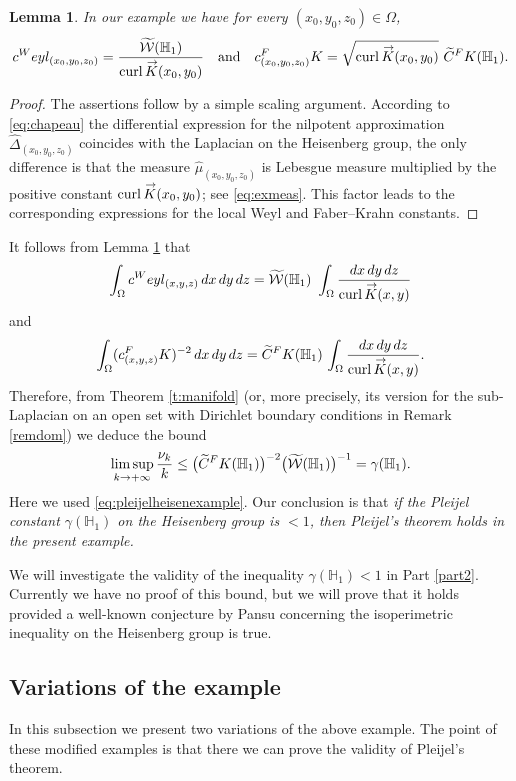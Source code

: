 \documentclass[11pt]{article}
\newcommand{\FK}{\textup{FK}}
\newcommand{\Weyl}{\textup{Weyl}}
\renewcommand{\vec}[1]
{\overset{\,{\raisebox{-2pt}{$\scriptstyle\to$}}}{#1}}
\newtheorem{lemma}[theorem]{Lemma}
\theoremstyle{definition}
\newcommand{\1}{\mathbbm{1}}
\numberwithin{equation}{section}
\begin{document}
\begin{lemma}\label{exampleconst}
In our example we have for every $(x_0,y_0,z_0)\in\Omega$,
\[
c^\Weyl_{(x_0,y_0,z_0)} = \frac{\widetilde{\mathcal W}(\mathbb H_1)}{\mathrm{curl}\,\vec{K}(x_0,y_0)}
\quad\text{and}\quad
c_{(x_0,y_0,z_0)}^\FK = \sqrt{\mathrm{curl}\,\vec{K}(x_0,y_0)} \ \widetilde C^\FK(\mathbb H_1).
\]
\end{lemma}

\begin{proof}
The assertions follow by a simple scaling argument. According to \eqref{eq:chapeau} the differential expression for the nilpotent approximation $\widehat\Delta_{(x_0,y_0,z_0)}$ coincides with the Laplacian on the Heisenberg group, the only difference is that the measure $\widehat\mu_{(x_0,y_0,z_0)}$ is Lebesgue measure multiplied by the positive constant $\mathrm{curl}\,\vec{K}(x_0,y_0)$; see \eqref{eq:exmeas}. This factor leads to the corresponding expressions for the local Weyl and Faber--Krahn constants.
\end{proof}

It follows from Lemma \ref{exampleconst} that
\[
\int_\Omega c^\Weyl_{(x,y,z)} \,dx\,dy\,dz = \widetilde{\mathcal W}(\mathbb H_1) \ \int_\Omega \frac{dx\,dy\,dz}{\text{curl}\,\vec{K}(x,y)}
\]
and
\[
\int_\Omega (c_{(x,y,z)}^\FK)^{-2} \,dx\,dy\,dz = \widetilde C^\FK(\mathbb H_1) \,\int_\Omega \frac{dx\,dy\,dz}{\text{curl}\,\vec{K}(x,y)}.
\]
Therefore, from Theorem \ref{t:manifold} (or, more precisely, its version for the sub-Laplacian on an open set with Dirichlet boundary conditions in Remark \ref{remdom}) we deduce the bound
\[
\limsup_{k\to+\infty} \frac{\nu_k}{k} \leq \bigl(\widetilde C^\FK(\mathbb H_1)\bigr)^{-2} \bigl(\widetilde{\mathcal W}(\mathbb H_1)\bigr)^{-1} = \gamma(\mathbb H_1).
\]
Here we used \eqref{eq:pleijelheisenexample}. Our conclusion is that \emph{if the Pleijel constant $\gamma(\mathbb H_1)$ on the Heisenberg group is $<1$, then Pleijel's theorem holds in the present example.}

We will investigate the validity of the inequality $\gamma(\mathbb H_1)<1$ in Part \ref{part2}. Currently we have no proof of this bound, but we will prove that it holds provided a well-known conjecture by Pansu concerning the isoperimetric inequality on the Heisenberg group is true.

\subsection{Variations of the example}
In this subsection we present two variations of the above example. The point of these modified examples is that there we can prove the validity of Pleijel's theorem.
\end{document}
